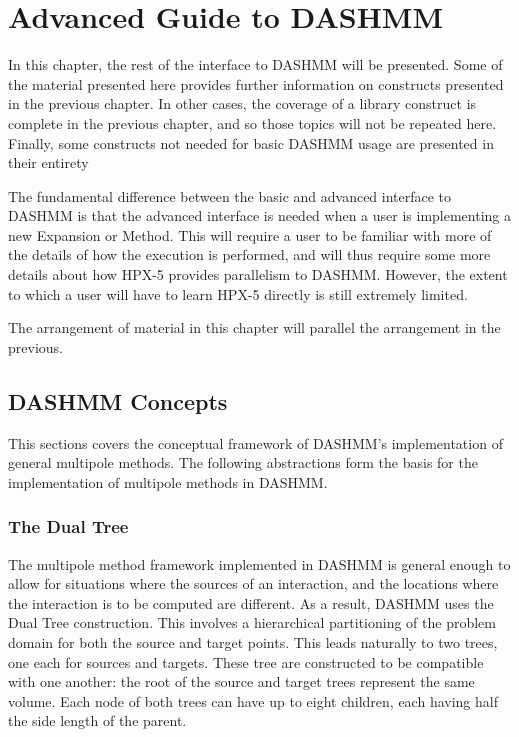 \chapter{Advanced Guide to DASHMM}
\label{ch:advanced}

In this chapter, the rest of the interface to DASHMM will be presented. Some
of the material presented here provides further information on constructs
presented in the previous chapter. In other cases, the coverage of a library
construct is complete in the previous chapter, and so those topics will not be
repeated here. Finally, some constructs not needed for basic DASHMM usage
are presented in their entirety

The fundamental difference between the basic and advanced interface to
DASHMM is that the advanced interface is needed when a user is implementing
a new Expansion or Method. This will require a user to be familiar with more
of the details of how the execution is performed, and will thus require some
more details about how HPX-5 provides parallelism to DASHMM. However, the
extent to which a user will have to learn HPX-5 directly is still extremely
limited.

The arrangement of material in this chapter will parallel the arrangement in
the previous.

\section{DASHMM Concepts}
\label{sec:advconcepts}

This sections covers the conceptual framework of DASHMM's implementation
of general multipole methods.
The following abstractions form the basis for the implementation of multipole
methods in DASHMM.

\subsection{The Dual Tree}

The multipole method framework implemented in DASHMM is general enough to allow
for situations where the sources of an interaction, and the locations where the
interaction is to be computed are different. As a result, DASHMM uses the Dual
Tree construction. This involves a hierarchical partitioning of the problem
domain for both the source and target points. This leads naturally to two
trees, one each for sources and targets. These tree are constructed to be
compatible with one another: the root of the source and target trees represent
the same volume. Each node of both trees can have up to eight children,
each having half the side length of the parent.

